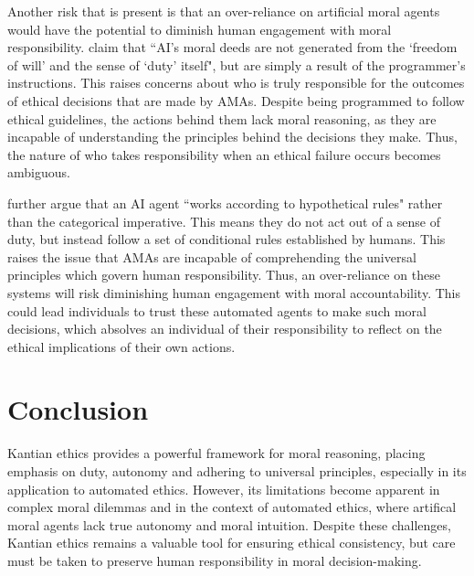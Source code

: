 \documentclass{article}
\begin{document}
Another risk that is present is that an over-reliance on artificial moral agents would have the potential to diminish human engagement
with moral responsibility. \textcite[p. 146]{mannananth2021} claim that ``AI's moral deeds are not generated from
the `freedom of will' and the sense of `duty' itself", but are simply a result of the programmer's instructions. 
This raises concerns about who is truly responsible for the outcomes of ethical decisions that are made by AMAs. 
Despite being programmed to follow ethical guidelines, the actions behind them lack moral reasoning, as they are 
incapable of understanding the principles behind the decisions they make. Thus, the nature of who takes responsibility
when an ethical failure occurs becomes ambiguous.

\textcite[p. 148]{mannananth2021} further argue that an AI agent ``works according to hypothetical rules" rather than 
the categorical imperative. This means they do not act out of a sense of duty, but instead follow a set of conditional
rules established by humans. This raises the issue that AMAs are incapable of comprehending the universal principles
which govern human responsibility. Thus, an over-reliance on these systems will risk diminishing human engagement with moral
accountability. This could lead individuals to trust these automated agents to make such moral decisions, which
absolves an individual of their responsibility to reflect on the ethical implications of their own actions.


\section{Conclusion}

Kantian ethics provides a powerful framework for moral reasoning, placing emphasis on duty, autonomy
and adhering to universal principles, especially in its application to automated ethics. However, its 
limitations become apparent in complex moral dilemmas and in the context of automated ethics, where
artifical moral agents lack true autonomy and moral intuition. Despite these challenges, Kantian
ethics remains a valuable tool for ensuring ethical consistency, but care must be taken to preserve
human responsibility in moral decision-making.
\printbibliography[title={References}]
\end{document}
